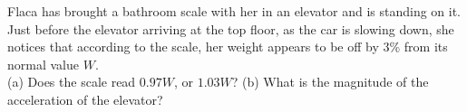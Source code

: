 Flaca has brought a bathroom scale with her in an elevator and is standing on it.
Just before the elevator
arriving at the top floor, as the car is slowing down, she
notices that according to the scale, her weight appears to be off by 3\% from its normal value $W$.\\
%
(a) Does the scale read $0.97W$, or $1.03W$?\answercheck\hwendpart
%
(b) What is the magnitude of the acceleration of the elevator?\answercheck
